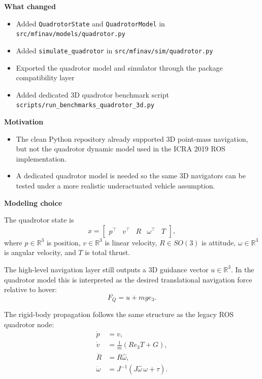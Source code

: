 \documentclass[11pt]{article}
\begin{document}
\textbf{What changed}

\begin{itemize}[leftmargin=*]
  \item Added \texttt{QuadrotorState} and \texttt{QuadrotorModel} in \texttt{src/mfinav/models/quadrotor.py}
  \item Added \texttt{simulate\_quadrotor} in \texttt{src/mfinav/sim/quadrotor.py}
  \item Exported the quadrotor model and simulator through the package compatibility layer
  \item Added dedicated 3D quadrotor benchmark script \texttt{scripts/run\_benchmarks\_quadrotor\_3d.py}
\end{itemize}

\textbf{Motivation}

\begin{itemize}[leftmargin=*]
  \item The clean Python repository already supported 3D point-mass navigation, but not the quadrotor dynamic model used in the ICRA 2019 ROS implementation.
  \item A dedicated quadrotor model is needed so the same 3D navigators can be tested under a more realistic underactuated vehicle assumption.
\end{itemize}

\textbf{Modeling choice}

The quadrotor state is
\[
x = \begin{bmatrix} p^\top & v^\top & R & \omega^\top & T \end{bmatrix},
\]
where \(p \in \mathbb{R}^3\) is position, \(v \in \mathbb{R}^3\) is linear
velocity, \(R \in SO(3)\) is attitude, \(\omega \in \mathbb{R}^3\) is angular
velocity, and \(T\) is total thrust.

The high-level navigation layer still outputs a 3D guidance vector
\(u \in \mathbb{R}^3\). In the quadrotor model this is interpreted as the
desired translational navigation force relative to hover:
\[
F_Q = u + m g e_3 .
\]

The rigid-body propagation follows the same structure as the legacy ROS
quadrotor node:
\begin{align}
\dot{p} &= v, \\
\dot{v} &= \frac{1}{m}\left(R e_3 T + G\right), \\
\dot{R} &= R \hat{\omega}, \\
\dot{\omega} &= J^{-1}\left(J \hat{\omega}\,\omega + \tau\right).
\end{align}
\end{document}

